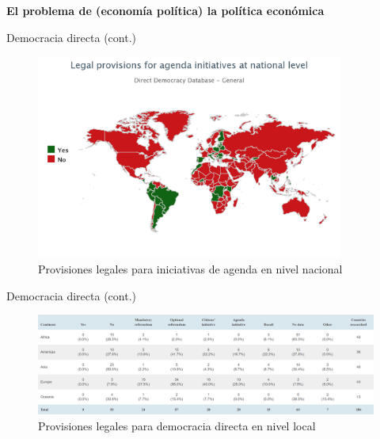 \documentclass[
  ignorenonframetext,
]{beamer}
\begin{document}
\begin{frame}{\textbf{El problema de (economía política) la política
económica}}
\begin{block}{Democracia directa (cont.)}
\protect\hypertarget{democracia-directa-cont.}{}
\begin{figure}

{\centering \includegraphics[width=0.9\textwidth,height=\textheight]{../epol/fig/fig-02-010.png}

}

\caption{Provisiones legales para iniciativas de agenda en nivel
nacional}

\end{figure}
\end{block}

\begin{block}{Democracia directa (cont.)}
\protect\hypertarget{democracia-directa-cont.-1}{}
\begin{figure}

{\centering \includegraphics{../epol/fig/fig-02-011.png}

}

\caption{Provisiones legales para democracia directa en nivel local}

\end{figure}
\end{block}


\end{frame}
\end{document}
